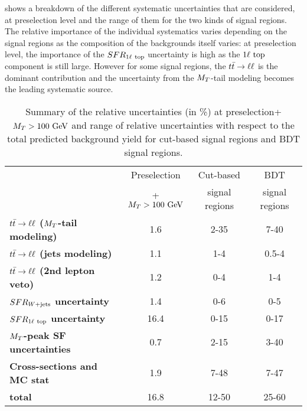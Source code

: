      shows a breakdown of the different
    systematic uncertainties that are considered, at preselection level and the
    range of them for the two kinds of signal regions. The relative importance
    of the individual systematics varies depending on the signal regions as the
    composition of the backgrounds itself varies: at preselection level, the
    importance of the $SFR_{1\ell~\text{top}}$ uncertainty is high as the
    $1\ell~\text{top}$ component is still large.  However for some signal regions,
    the $t\bar{t} \rightarrow \ell \ell$ is the dominant contribution and the uncertainty from the
    $M_T$-tail modeling becomes the leading systematic source.


    \begin{table}[!ht]
    \begin{center}
    \begin{tabular}{|l|c|cc|}
        \hline
                                                       & Preselection    & Cut-based      & BDT             \\
                                                       & + $M_T>100~\text{GeV}$ & signal regions & signal regions  \\
        \hline
        \textbf{$t\bar{t} \rightarrow \ell \ell$ ($M_T$-tail modeling)}  & 1.6                      & 2-35         & 7-40    \\
        \textbf{$t\bar{t} \rightarrow \ell \ell$ (jets modeling)}        & 1.1                      & 1-4          & 0.5-4   \\
        \textbf{$t\bar{t} \rightarrow \ell \ell$ (2nd lepton veto)}      & 1.2                      & 0-4          & 1-4     \\
        \textbf{$SFR_{\text{$W$+jets}}$ uncertainty}               & 1.4                      & 0-6          & 0-5     \\
        \textbf{$SFR_{1\ell~\text{top}}$ uncertainty}        & 16.4                     & 0-15         & 0-17    \\
        \textbf{$M_T$-peak SF uncertainties}           & 0.7                      & 2-15         & 3-40    \\
        \textbf{Cross-sections and MC stat}            & 1.9                      & 7-48         & 7-47    \\
        \hline
        \textbf{total}                                 & 16.8                     & 12-50        & 25-60   \\
        \hline
    \end{tabular}
    \caption{Summary of the relative uncertainties (in \%) at
    preselection+$M_T>100~\text{GeV}$ and range of relative uncertainties with respect
    to the total predicted background yield for cut-based signal regions and BDT
    signal regions.
    \label{tab:systematicsSummary}}
    \end{center}
    \end{table}

